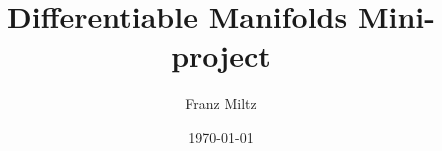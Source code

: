 \documentclass{article}
\begin{document}
\title{Differentiable Manifolds Mini-project}
\author{Franz Miltz}
\date{\today}
\maketitle
\end{document}
